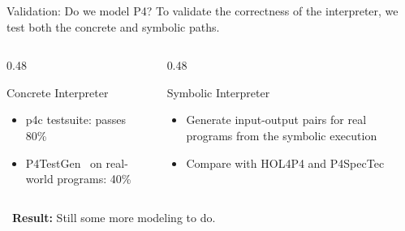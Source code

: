 \begin{frame}{Validation: Do we model P4?}
  \vspace{0.4em}
  To validate the correctness of the interpreter, we test both the concrete and symbolic paths.

  \vspace{0.8em}
  \begin{columns}[T,onlytextwidth]
    \begin{column}{0.48\textwidth}
      \begin{block}{Concrete Interpreter}
        \small
        \begin{itemize}\setlength\itemsep{6pt}
          \item p4c testsuite: passes 80\%
          \item P4TestGen~\cite{10.1145/3603269.3604834} on real-world programs: 40\%
        \end{itemize}
      \end{block}
    \end{column}

    \begin{column}{0.48\textwidth}
      \begin{block}{Symbolic Interpreter}
        \small
        \begin{itemize}\setlength\itemsep{6pt}
          \item Generate input-output pairs for real programs from the symbolic execution
          \item Compare with HOL4P4 and P4SpecTec
        \end{itemize}
      \end{block}
    \end{column}
  \end{columns}

  \vspace{0.6em}
  \centering
  \textcolor{palOlivine!60!black}{\checkmark}\ \textbf{Result:} Still some more modeling to do.
\end{frame}

